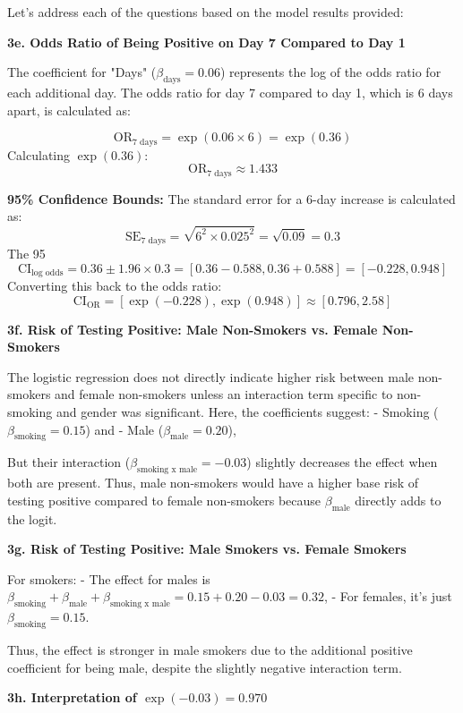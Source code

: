 \documentclass{article}
\begin{document}
Let's address each of the questions based on the model results provided:

\textbf{3e. Odds Ratio of Being Positive on Day 7 Compared to Day 1}

The coefficient for "Days" (\(\beta_{\text{days}} = 0.06\)) represents the log of the odds ratio for each additional day. The odds ratio for day 7 compared to day 1, which is 6 days apart, is calculated as:

\[
\text{OR}_{\text{7 days}} = \exp(0.06 \times 6) = \exp(0.36)
\]
Calculating \(\exp(0.36)\):
\[
\text{OR}_{\text{7 days}} \approx 1.433
\]

\textbf{95\% Confidence Bounds:}
The standard error for a 6-day increase is calculated as:
\[
\text{SE}_{\text{7 days}} = \sqrt{6^2 \times 0.025^2} = \sqrt{0.09} = 0.3
\]
The 95%
\[
\text{CI}_{\text{log odds}} = 0.36 \pm 1.96 \times 0.3 = [0.36 - 0.588, 0.36 + 0.588] = [-0.228, 0.948]
\]
Converting this back to the odds ratio:
\[
\text{CI}_{\text{OR}} = [\exp(-0.228), \exp(0.948)] \approx [0.796, 2.58]
\]

\textbf{3f. Risk of Testing Positive: Male Non-Smokers vs. Female Non-Smokers}

The logistic regression does not directly indicate higher risk between male non-smokers and female non-smokers unless an interaction term specific to non-smoking and gender was significant. Here, the coefficients suggest:
- Smoking (\(\beta_{\text{smoking}} = 0.15\)) and
- Male (\(\beta_{\text{male}} = 0.20\)),

But their interaction (\(\beta_{\text{smoking x male}} = -0.03\)) slightly decreases the effect when both are present. Thus, male non-smokers would have a higher base risk of testing positive compared to female non-smokers because \(\beta_{\text{male}}\) directly adds to the logit.

\textbf{3g. Risk of Testing Positive: Male Smokers vs. Female Smokers}

For smokers:
- The effect for males is \(\beta_{\text{smoking}} + \beta_{\text{male}} + \beta_{\text{smoking x male}} = 0.15 + 0.20 - 0.03 = 0.32\),
- For females, it's just \(\beta_{\text{smoking}} = 0.15\).

Thus, the effect is stronger in male smokers due to the additional positive coefficient for being male, despite the slightly negative interaction term.

\textbf{3h. Interpretation of \( \exp(-0.03) = 0.970 \)}
\end{document}
